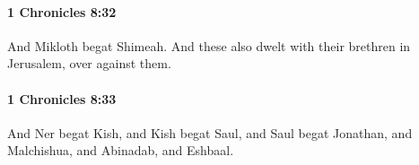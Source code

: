 		\paragraph{1 Chronicles 8:32} %
			\label{1CHRONICLES-8-32}

			And Mikloth begat Shimeah. And these also dwelt with their brethren in Jerusalem, over against them.


		\paragraph{1 Chronicles 8:33} %
			\label{1CHRONICLES-8-33}

			And Ner begat Kish, and Kish begat Saul, and Saul begat Jonathan, and Malchishua, and Abinadab, and Eshbaal.


